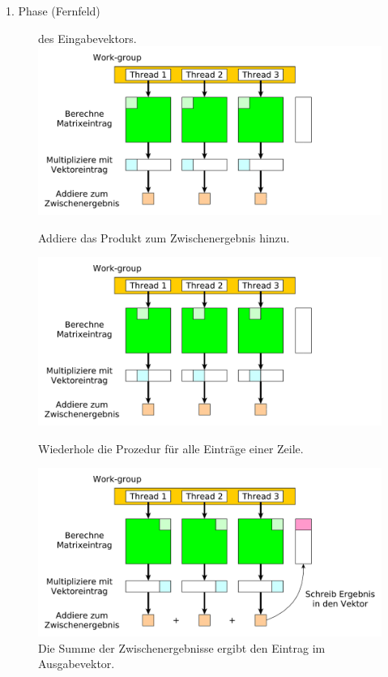 \documentclass[10pt]{beamer}
\begin{document}
\begin{frame}{1. Phase (Fernfeld)}
\begin{figure}
\begin{overprint}
{                 des Eingabevektors.}
        \centering
        \includegraphics[width=\linewidth]{figures/fg-ff-add-interim-result.pdf}
        \caption{Addiere das Produkt zum Zwischenergebnis hinzu.}
        \centering
        \includegraphics[width=\linewidth]{figures/fg-ff-next-column.pdf}
        \caption{Wiederhole die Prozedur f\"ur alle Eintr\"age einer Zeile.}
        \centering
        \includegraphics[width=\linewidth]{figures/fg-ff-write-result.pdf}
        \caption{Die Summe der Zwischenergebnisse ergibt den Eintrag im
                 Ausgabevektor.}
    \end{overprint}
  \end{figure}
\end{frame}
\end{document}
